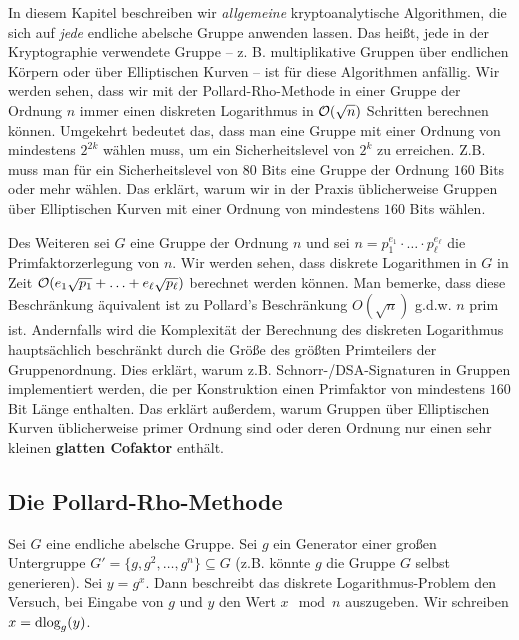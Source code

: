 \begin{refsegment}
In diesem Kapitel beschreiben wir {\em allgemeine} kryptoanalytische Algorithmen, die sich auf {\em jede} endliche abelsche Gruppe anwenden lassen. Das heißt, jede in der Kryptographie verwendete Gruppe -- z. B. multiplikative Gruppen über endlichen Körpern oder über Elliptischen Kurven -- ist für diese Algorithmen anfällig. Wir werden sehen, dass wir mit der Pollard-Rho-Methode in einer Gruppe der Ordnung $n$ immer einen diskreten Logarithmus in ${\cal O}(\sqrt n)$ Schritten berechnen können. Umgekehrt bedeutet das, dass man eine Gruppe mit einer Ordnung von mindestens $2^{2k}$ wählen muss, um ein Sicherheitslevel von $2^{k}$ zu erreichen. Z.B. muss man für ein Sicherheitslevel von $80$ Bits eine Gruppe der Ordnung $160$ Bits oder mehr wählen. Das erklärt, warum wir in der Praxis üblicherweise Gruppen über Elliptischen Kurven mit einer Ordnung von mindestens $160$ Bits wählen.

Des Weiteren sei $G$ eine Gruppe der Ordnung $n$ und sei $n=p_1^{e_1} \cdot \ldots \cdot p_{\ell}^{e_{\ell}}$ die Primfaktorzerlegung von $n$. Wir werden sehen, dass diskrete Logarithmen in $G$ in Zeit ${\cal O}(e_1 \sqrt{p_1} + \ldots + e_{\ell}\sqrt{p_{\ell}})$ berechnet werden können. Man bemerke, dass diese Beschränkung äquivalent ist zu Pollard's Beschränkung $O(\sqrt n)$ g.d.w. $n$ prim ist. Andernfalls wird die Komplexität der Berechnung des diskreten Logarithmus hauptsächlich beschränkt durch die Größe des größten Primteilers der Gruppenordnung. Dies erklärt, warum z.B. Schnorr-/DSA-Signaturen in Gruppen implementiert werden, die per Konstruktion einen Primfaktor von mindestens $160$ Bit Länge enthalten. Das erklärt außerdem, warum Gruppen über Elliptischen Kurven üblicherweise primer Ordnung sind oder deren Ordnung nur einen sehr kleinen \textbf{glatten Cofaktor} enthält.



\DIFaddend \subsection{Die Pollard-Rho-Methode}
Sei $G$ eine endliche abelsche Gruppe. Sei $g$ ein Generator einer großen Untergruppe $G' = \{g, g^2, \ldots, g^n\} \subseteq G$ (z.B. könnte $g$ die Gruppe $G$ selbst generieren). Sei $y=g^{x}$. Dann beschreibt das diskrete Logarithmus-Problem den Versuch, bei Eingabe von $g$ und $y$ den Wert $x \mod n$ auszugeben.
Wir schreiben $x=\textrm{dlog}_g(y)$.


\end{refsegment}
